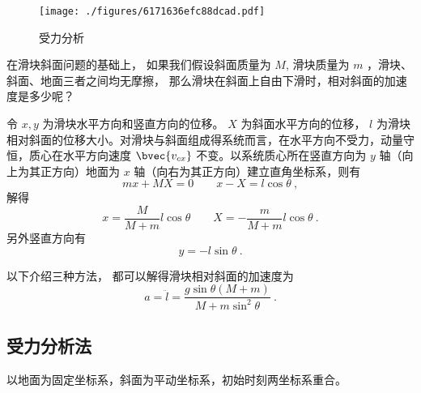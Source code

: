 


\begin{figure}[ht]
\centering
\texttt{[image: ./figures/6171636efc88dcad.pdf]}
\caption{受力分析} \label{fig_blkSlp_1}
\end{figure}

在滑块斜面问题的基础上， 如果我们假设斜面质量为 $M$, 滑块质量为 $m$ ，滑块、斜面、地面三者之间均无摩擦， 那么滑块在斜面上自由下滑时，相对斜面的加速度是多少呢？

令 $x, y$ 为滑块水平方向和竖直方向的位移。 $X$ 为斜面水平方向的位移， $l$ 为滑块相对斜面的位移大小。对滑块与斜面组成得系统而言，在水平方向不受力，动量守恒，质心在水平方向速度 $\bvec{v_{cx}}$ 不变。以系统质心所在竖直方向为 $y$ 轴（向上为其正方向）地面为 $x$ 轴（向右为其正方向）建立直角坐标系，则有
\begin{equation}
mx+MX=0 \qquad x-X=l\cos\theta~,
\end{equation}
解得
\begin{equation}\label{eq_blkSlp_2}
x = \frac{M}{M + m}l\cos\theta \qquad X = -\frac{m}{M + m}l\cos\theta~.
\end{equation}
另外竖直方向有
\begin{equation}
y = -l\sin\theta~.
\end{equation}

以下介绍三种方法， 都可以解得滑块相对斜面的加速度为
\begin{equation}\label{eq_blkSlp_1}
a = \ddot l = \frac{g\sin\theta(M+m)}{M + m\sin^2\theta}~.
\end{equation}

\subsection{受力分析法}
以地面为固定坐标系，斜面为平动坐标系，初始时刻两坐标系重合。

